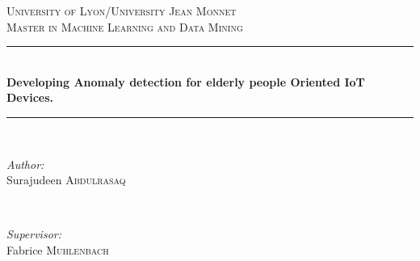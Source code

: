 \documentclass[a4paper, parskip=full]{scrartcl}
\date{}
\begin{document}
	

\begin{titlepage}
	
	\newcommand{\HRule}{\rule{\linewidth}{0.5mm}} %
	
	\center %
	
	
	\textsc{\LARGE University of Lyon/University Jean Monnet}\\[1.5cm] %
	\textsc{\Large Master in Machine Learning and Data Mining}\\[0.5cm] %
	
	
	\HRule \\[0.4cm]
	{ \huge \bfseries Developing Anomaly detection for elderly people Oriented IoT Devices.}\\[0.4cm] %
	\HRule \\[1.5cm]
	
	
	\begin{minipage}{0.4\textwidth}
		\begin{flushleft} \large
			\emph{Author:}\\
			Surajudeen \textsc{Abdulrasaq} %
		\end{flushleft}
	\end{minipage}
	~
	\begin{minipage}{0.4\textwidth}
		\begin{flushright} \large
			\emph{Supervisor:} \\
			Fabrice  \textsc{Muhlenbach} %
		\end{flushright}
	\end{minipage}\\[2cm]
	

\end{titlepage}
\end{document}
